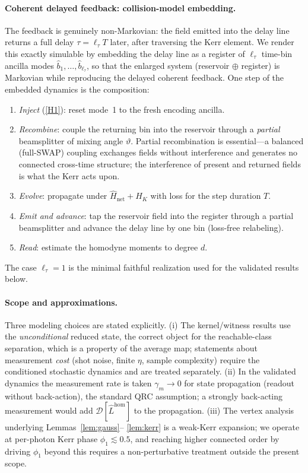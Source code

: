 \documentclass[11pt]{article}
\theoremstyle{remark}
\begin{document}
\paragraph{Coherent delayed feedback: collision-model embedding.}
The feedback is genuinely non-Markovian: the field emitted into the delay line
returns a full delay $\tau=\ell_\tau T$ later, after traversing the Kerr element.
We render this exactly simulable by embedding the delay line as a register of
$\ell_\tau$ time-bin ancilla modes $\hat b_1,\dots,\hat b_{\ell_\tau}$, so that the
enlarged system (reservoir $\oplus$ register) is Markovian while reproducing the
delayed coherent feedback. One step of the embedded dynamics is the composition:
\begin{enumerate}[label=(\roman*),leftmargin=2.2em]
\item \emph{Inject} (\ref{H1}): reset mode~1 to the fresh encoding ancilla.
\item \emph{Recombine}: couple the returning bin into the reservoir through a
\emph{partial} beamsplitter of mixing angle $\vartheta$. Partial recombination is
essential---a balanced (full-SWAP) coupling exchanges fields without interference
and generates no connected cross-time structure; the interference of present and
returned fields is what the Kerr acts upon.
\item \emph{Evolve}: propagate under $\hat H_{\mathrm{net}}+\hat H_K$ with loss
for the step duration $T$.
\item \emph{Emit and advance}: tap the reservoir field into the register through a
partial beamsplitter and advance the delay line by one bin (loss-free relabeling).
\item \emph{Read}: estimate the homodyne moments to degree $d$.
\end{enumerate}
The case $\ell_\tau=1$ is the minimal faithful realization used for the validated
results below.

\paragraph{Scope and approximations.}
Three modeling choices are stated explicitly. (i) The kernel/witness results use
the \emph{unconditional} reduced state, the correct object for the
reachable-class separation, which is a property of the average map; statements
about measurement \emph{cost} (shot noise, finite $\eta$, sample complexity)
require the conditioned stochastic dynamics and are treated separately. (ii) In
the validated dynamics the measurement rate is taken $\gamma_m\to0$ for state
propagation (readout without back-action), the standard QRC assumption; a strongly
back-acting measurement would add $\mathcal D[\hat L^{\mathrm{hom}}]$ to the
propagation. (iii) The vertex analysis underlying Lemmas~\ref{lem:gauss}--%
\ref{lem:kerr} is a weak-Kerr expansion; we operate at per-photon Kerr phase
$\phi_1\lesssim0.5$, and reaching higher connected order by driving $\phi_1$ beyond
this requires a non-perturbative treatment outside the present scope.
\end{document}
